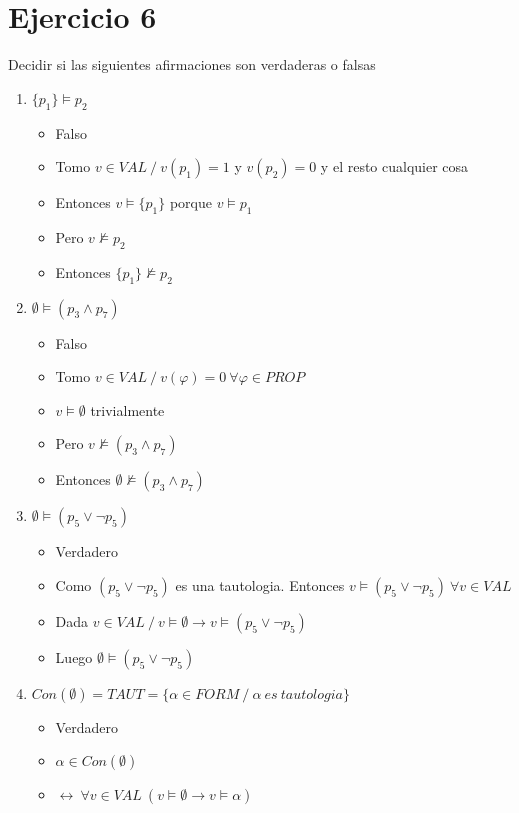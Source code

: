 \documentclass[14pt,a4paper,fleqn]{article}
\newcommand{\entonces}{\rightarrow}
\newcommand{\satisface}{\vDash}
\newcommand{\conSeman}{\vDash}
\newcommand{\noConSeman}{\nvDash}
\newcommand{\nosatisf}{\nvDash}
\newcommand{\y}{\wedge}
\renewcommand{\o}{\vee}
\newcommand{\sii}{\leftrightarrow}
\newcommand{\tq}{\ensuremath{\: / \:}}
\newcommand{\val}{\ensuremath{v \in VAL }}
\newcommand{\prop}{\ensuremath{\in PROP}}
\newcommand{\paraTodo}{\ensuremath{\: \forall}}
\newcommand{\vacio}{\emptyset}
\begin{document}
\newpage
\section*{Ejercicio 6}
Decidir si las siguientes afirmaciones son verdaderas o falsas\\
\begin{enumerate}
	\item $\{p_{1}\} \conSeman p_{2}$
	\begin{itemize}
		\item Falso
		\item Tomo $v \in VAL \: / \: v(p_{1}) = 1 $ y $v(p_{2}) = 0$ y el resto cualquier cosa
		\item Entonces $v \satisface \{p_{1}\} $ porque $v \satisface p_{1}$
		\item Pero $v \nosatisf p_{2}$
		\item Entonces $\{p_{1}\} \noConSeman p_{2}$ 
	\end{itemize}
	\item $ \emptyset \conSeman (p_{3} \y p_{7}) $
	\begin{itemize}
		\item Falso
		\item Tomo $\val \tq v(\varphi) = 0 \paraTodo \varphi \prop $
		\item $v \satisface \emptyset $ trivialmente
		\item Pero $v \nosatisf ( p_{3} \y p_{7})$
		\item Entonces $\emptyset \noConSeman (p_{3} \y p_7)$
	\end{itemize}
	\item $ \emptyset \conSeman (p_{5} \o \neg p_{5})$
	\begin{itemize}
		\item Verdadero
		\item Como $(p_5 \o \neg p_5)$ es una tautologia. Entonces $ v \satisface (p_5 \o \neg p_5) \paraTodo \val$
		\item Dada $\val \tq v \satisface \emptyset  \entonces v \satisface ( p_5 \o \neg p_5 )$
		\item Luego $ \emptyset \conSeman (p_{5} \o \neg p_{5}) $
	\end{itemize}
	\item $ Con(\emptyset) = TAUT = \{ \alpha \in FORM \: / \: \alpha \: es \: tautologia \}$
	\begin{itemize}
		\item Verdadero
		\item $\alpha \in Con(\emptyset) $
		\item $\sii \paraTodo \val \: (v \satisface \vacio \entonces v \satisface \alpha)$

\end{itemize}
\end{enumerate}
\end{document}

